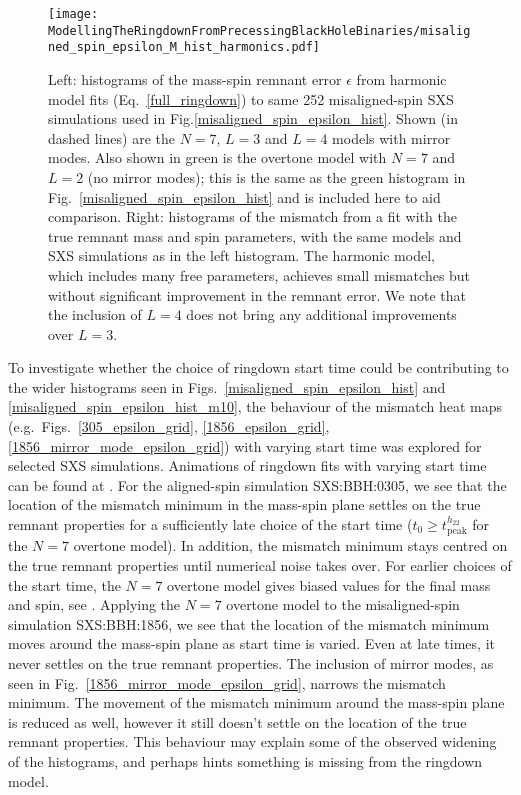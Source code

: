 \begin{figure*}[t]
    \centering
    \texttt{[image: ModellingTheRingdownFromPrecessingBlackHoleBinaries/misaligned\_spin\_epsilon\_M\_hist\_harmonics.pdf]}
    \caption[Remnant error and mismatches for fits to misaligned-spin SXS simulations using the harmonic model]{Left: histograms of the mass-spin remnant error $\epsilon$ from harmonic model fits (Eq.~\ref{full_ringdown}) to same 252 misaligned-spin SXS simulations used in Fig.\ref{misaligned_spin_epsilon_hist}. Shown (in dashed lines) are the $N=7$, $L=3$ and $L=4$ models with mirror modes. Also shown in green is the overtone model with $N=7$ and $L=2$ (no mirror modes); this is the same as the green histogram in Fig.~\ref{misaligned_spin_epsilon_hist} and is included here to aid comparison. Right: histograms of the mismatch from a fit with the true remnant mass and spin parameters, with the same models and SXS simulations as in the left histogram. The harmonic model, which includes many free parameters, achieves small mismatches but without significant improvement in the remnant error. We note that the inclusion of $L=4$ does not bring any additional improvements over $L=3$.}
    \label{misaligned_spin_epsilon_hist_harmonics}
\end{figure*}

To investigate whether the choice of ringdown start time could be contributing to the wider histograms seen in Figs.~\ref{misaligned_spin_epsilon_hist} and \ref{misaligned_spin_epsilon_hist_m10}, the behaviour of the mismatch heat maps (e.g.\ Figs.~\ref{305_epsilon_grid}, \ref{1856_epsilon_grid}, \ref{1856_mirror_mode_epsilon_grid}) with varying start time was explored for selected SXS simulations. 
Animations of ringdown fits with varying start time can be found at \cite{finch_eliot_2021_4538194}.
For the aligned-spin simulation SXS:BBH:0305, we see that the location of the mismatch minimum in the mass-spin plane settles on the true remnant properties for a sufficiently late choice of the start time ($t_0 \geq t_{\mathrm{peak}}^{h_{22}}$ for the $N=7$ overtone model). 
In addition, the mismatch minimum stays centred on the true remnant properties until numerical noise takes over.
For earlier choices of the start time, the $N=7$ overtone model gives biased values for the final mass and spin, see \cite{finch_eliot_2021_4538194}.
Applying the $N=7$ overtone model to the misaligned-spin simulation SXS:BBH:1856, we see that the location of the mismatch minimum moves around the mass-spin plane as start time is varied. Even at late times, it never settles on the true remnant properties.
The inclusion of mirror modes, as seen in Fig.~\ref{1856_mirror_mode_epsilon_grid}, narrows the mismatch minimum. The movement of the mismatch minimum around the mass-spin plane is reduced as well, however it still doesn't settle on the location of the true remnant properties.
This behaviour may explain some of the observed widening of the histograms, and perhaps hints something is missing from the ringdown model.


